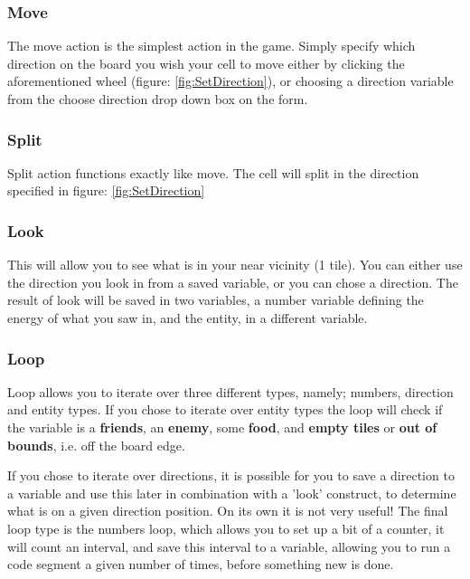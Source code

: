 \subsubsection{Move}

The move action is the simplest action in the game. Simply specify which direction on the board you wish your cell to move either by clicking the aforementioned wheel (figure: \ref{fig:SetDirection}), or choosing a direction variable from the choose direction drop down box on the form.

\subsubsection{Split}

Split action functions exactly like move. The cell will split in the direction specified in figure: \ref{fig:SetDirection}

\subsubsection{Look}

This will allow you to see what is in your near vicinity (1 tile). You can either use the direction you look in from a saved variable, or you can chose a direction. The result of look will be saved in two variables, a number variable defining the energy of what you saw in, and the entity, in a different variable.

\subsubsection{Loop}

Loop allows you to iterate over three different types, namely; numbers, direction and entity types. If you chose to iterate over entity types the loop will check if the variable is a \textbf{friends}, an \textbf{enemy}, some \textbf{food}, and \textbf{empty tiles} or \textbf{out of bounds}, i.e. off the board edge.


If you chose to iterate over directions, it is possible for you to save a direction to a variable and use this later in combination with a 'look' construct, to determine what is on a given direction position. On its own it is not very useful! The final loop type is the numbers loop, which allows you to set up a bit of a counter, it will count an interval, and save this interval to a variable, allowing you to run a code segment a given number of times, before something new is done.

